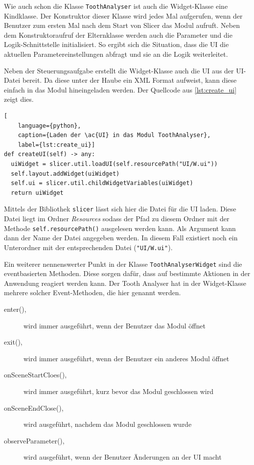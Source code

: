 Wie auch schon die Klasse \texttt{ToothAnalyser} ist auch die Widget-Klasse eine
Kindklasse. Der Konstruktor dieser Klasse wird jedes Mal aufgerufen, wenn der
Benutzer zum ersten Mal nach dem Start von Slicer das Modul aufruft. Neben dem Konstruktoraufruf
der Elternklasse werden auch die Parameter und die Logik-Schnittstelle initialisiert.
So ergibt sich die Situation, dass die \ac{UI} die aktuellen
Parametereinstellungen abfragt und sie an die Logik weiterleitet.

Neben der Steuerungsaufgabe erstellt die Widget-Klasse auch die \ac{UI} aus der \ac{UI}-Datei
bereit. Da diese unter der Haube ein \ac{XML} Format aufweist, kann diese einfach
in das Modul hineingeladen werden. Der Quellcode aus \ref{lst:create_ui} zeigt
dies.

\begin{lstlisting}[
    language={python},
    caption={Laden der \ac{UI} in das Modul ToothAnalyser},
    label={lst:create_ui}]
def createUI(self) -> any:
  uiWidget = slicer.util.loadUI(self.resourcePath("UI/W.ui"))
  self.layout.addWidget(uiWidget)
  self.ui = slicer.util.childWidgetVariables(uiWidget)
  return uiWidget
\end{lstlisting}

Mittels der Bibliothek \texttt{slicer} lässt sich hier die Datei für die \ac{UI}
laden. Diese Datei liegt im Ordner \textit{Resources} sodass der Pfad zu diesem Ordner
mit der Methode \texttt{self.resourcePath()} ausgelesen werden kann. Als Argument
kann dann der Name der Datei angegeben werden. In diesem Fall existiert noch ein
Unterordner mit der entsprechenden Datei (\texttt{"UI/W.ui"}).

Ein weiterer nennenswerter Punkt in der Klasse \texttt{ToothAnalyserWidget} sind
die eventbasierten Methoden. Diese sorgen dafür, dass auf bestimmte Aktionen in
der Anwendung reagiert werden kann. Der Tooth Analyser hat in der Widget-Klasse mehrere
solcher Event-Methoden, die hier genannt werden.

\begin{description}
	\item[enter(),] wird immer ausgeführt, wenn der Benutzer das Modul öffnet

	\item[exit(),] wird immer ausgeführt, wenn der Benutzer ein anderes Modul
		öffnet

	\item[onSceneStartCloes(),] wird immer ausgeführt, kurz bevor das Modul
		geschlossen wird

	\item[onSceneEndClose(),] wird ausgeführt, nachdem das Modul geschlossen wurde

	\item[observeParameter(),] wird ausgeführt, wenn der Benutzer Änderungen an
		der \ac{UI} macht
\end{description}

